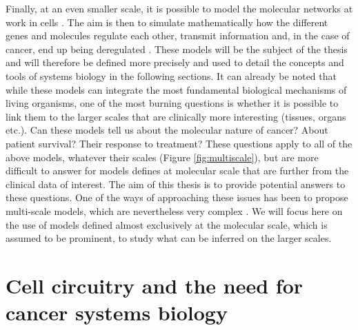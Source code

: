 \documentclass[a4paper,12pt,twoside,onecolumn,openright,final,oldfontcommands]{memoir}
\begin{document}
Finally, at an even smaller scale, it is possible to model the molecular
networks at work in cells \citep{le2015quantitative}. The aim is then to
simulate mathematically how the different genes and molecules regulate
each other, transmit information and, in the case of cancer, end up
being deregulated \citep{calzone2010mathematical, flobak2015discovery}.
These models will be the subject of the thesis and will therefore be
defined more precisely and used to detail the concepts and tools of
systems biology in the following sections. It can already be noted that
while these models can integrate the most fundamental biological
mechanisms of living organisms, one of the most burning questions is
whether it is possible to link them to the larger scales that are
clinically more interesting (tissues, organs etc.). Can these models
tell us about the molecular nature of cancer? About patient survival?
Their response to treatment? These questions apply to all of the above
models, whatever their scales (Figure \ref{fig:multiscale}), but are
more difficult to answer for models defines at molecular scale that are
further from the clinical data of interest. The aim of this thesis is to
provide potential answers to these questions. One of the ways of
approaching these issues has been to propose multi-scale models, which
are nevertheless very complex
\citep{anderson2008integrative, powathil2015systems}. We will focus here
on the use of models defined almost exclusively at the molecular scale,
which is assumed to be prominent, to study what can be inferred on the
larger scales.

\section{Cell circuitry and the need for cancer systems
biology}\label{cell-circuitry-and-the-need-for-cancer-systems-biology}
\end{document}
